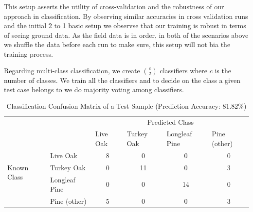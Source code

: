 \documentclass[remotesensing,article,accept,moreauthors,pdftex,12pt,a4paper]{mdpi}
\begin{document}
This setup asserts the utility of cross-validation and the robustness of our approach in classification. By observing similar accuracies in cross validation runs and the initial 2 to 1 basic setup we observse that our training is robust in terms of seeing ground data. As the field data is in order, in both of the scenarios above we shuffle the data before each run to make sure, this setup will not bia the training process.

Regarding multi-class classification, we create $\binom{c}{2}$ classifiers where $c$ is the number of classes. We train all the classifiers and to decide on the class a given test case belongs to we do majority voting among classifiers. 



\begin{table}[t]
\begin{center}

\begin{tabular}{llllll}
                                       &                       & \multicolumn{4}{c}{Predicted Class}                                                                          \\ \cline{3-6} 
                                       & \multicolumn{1}{l|}{} & \multicolumn{1}{l|}{Live Oak} & \multicolumn{1}{l|}{Turkey Oak} & \multicolumn{1}{l|}{Longleaf Pine} & \multicolumn{1}{l|}{Pine (other)} \\ \cline{2-6} 
\multicolumn{1}{l|}{\multirow{3}{*}{\begin{sideways}Known Class\end{sideways}}} & \multicolumn{1}{l|}{Live Oak}      & \multicolumn{1}{c|}{8} & \multicolumn{1}{c|}{0} & \multicolumn{1}{c|}{0} & \multicolumn{1}{c|}{0} \\ \cline{2-6} 
\multicolumn{1}{l|}{}                                                           & \multicolumn{1}{l|}{Turkey Oak}    & \multicolumn{1}{c|}{0} & \multicolumn{1}{c|}{11} & \multicolumn{1}{c|}{0} & \multicolumn{1}{c|}{3} \\ \cline{2-6} 
\multicolumn{1}{l|}{}                                                           & \multicolumn{1}{l|}{Longleaf Pine} & \multicolumn{1}{c|}{0} & \multicolumn{1}{c|}{0} & \multicolumn{1}{c|}{14} & \multicolumn{1}{c|}{0} \\ \cline{2-6} 
\multicolumn{1}{l|}{}                                                           & \multicolumn{1}{l|}{Pine (other)}  & \multicolumn{1}{c|}{5} & \multicolumn{1}{c|}{0} & \multicolumn{1}{c|}{0} & \multicolumn{1}{c|}{3} \\ \cline{2-6} 
\end{tabular}
 \caption{Classification Confusion Matrix of a Test Sample (Prediction Accuracy: 81.82\%)}
    \label{table:confusion matrix}\end{center}
\end{table}
\end{document}
